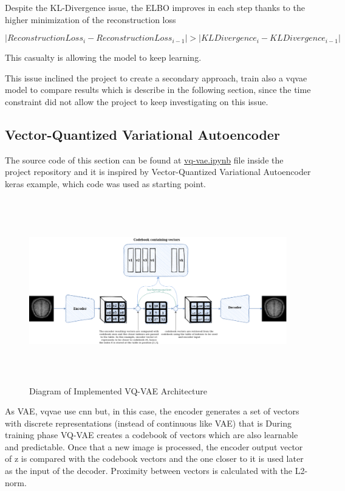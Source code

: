 Despite the KL-Divergence issue, the ELBO improves in each step thanks to the higher minimization of the reconstruction loss

\begin{equation}
    \left\lvert Reconstruction Loss_i - Reconstruction Loss_{i-1} \right\rvert > \left\lvert KL Divergence_i - KL Divergence_{i-1} \right\rvert
\end{equation}
 
This casualty is allowing the model to keep learning.

This issue inclined the project to create a secondary approach, train also a \acrshort*{vqvae} model to compare results which is describe in the following section, since the time constraint did not allow the project to keep investigating on this issue.

\subsection{Vector-Quantized Variational Autoencoder}

The source code of this section can be found at \href{https://github.com/mtablado/uoc2022_tfm/blob/main/vq-vae.ipynb}{vq-vae.ipynb} file inside the project repository and it is inspired by Vector-Quantized Variational Autoencoder \cite{vqvaekeras} keras example, which code was used as starting point.

\begin{figure}[ht]
    \centering
    \includegraphics[width = 16cm, height = 8cm]{images/vq-vae.png}
    \caption[Diagram of Implemented VQ-VAE Architecture]{Diagram of Implemented VQ-VAE Architecture}
    \label{fig:vqvaearch}
\end{figure}

As VAE, \acrshort*{vqvae} use \acrshort*{cnn} but, in this case, the encoder generates a set of vectors with discrete representations (instead of continuous like VAE)  that is 
During training phase VQ-VAE creates a codebook of vectors which are also learnable and predictable. Once that a new image is processed, the encoder output vector of z is compared with the codebook vectors and the one closer to it is used later as the input of the decoder. Proximity between vectors is calculated with the L2-norm.

